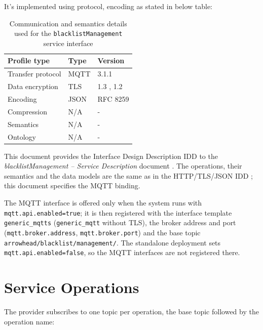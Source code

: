 \documentclass[a4paper]{arrowhead}
\begin{document}
It's implemented using protocol, encoding as stated in below table:
\begin{table}[ht!]
  \centering
  \begin{tabular}{|l|l|l|}
    \hline
    \rowcolor{gray!33} Profile type & Type & Version \\ \hline
    Transfer protocol & MQTT & 3.1.1 \cite{mqtt311} \\ \hline
    Data encryption & TLS & 1.3 \cite{rfc8446}, 1.2 \cite{rfc5246} \\ \hline
    Encoding & JSON & RFC 8259 \cite{rfc8259} \\ \hline
    Compression & N/A & - \\ \hline
    Semantics & N/A & - \\ \hline
    Ontology & N/A & - \\ \hline
  \end{tabular}
  \caption{Communication and semantics details used for the \texttt{blacklist\allowbreak{}Management} service interface}
  \label{tab:comunication_semantics_profile}
\end{table}

This document provides the Interface Design Description IDD to the \textit{blacklistManagement -- Service Description} document \cite{bl-blacklistManagement-sd}.
The operations, their semantics and the data models are the same as in the HTTP/TLS/JSON IDD \cite{bl-blacklistManagement-http-idd}; this document specifies the MQTT binding.

The MQTT interface is offered only when the system runs with \texttt{mqtt.api.enabled=true}; it is then registered with the interface template \texttt{generic\_\allowbreak{}mqtts} (\texttt{generic\_\allowbreak{}mqtt} without TLS), the broker address and port (\texttt{mqtt.\allowbreak{}broker.\allowbreak{}address}, \texttt{mqtt.\allowbreak{}broker.\allowbreak{}port}) and the base topic \texttt{arrowhead/\allowbreak{}blacklist/\allowbreak{}management/\allowbreak{}}. The standalone deployment sets \texttt{mqtt.\allowbreak{}api.\allowbreak{}enabled=\allowbreak{}false}, so the MQTT interfaces are not registered there.

\newpage

\section{Service Operations}
\label{sec:operations}

The provider subscribes to one topic per operation, the base topic followed by the operation name:
\end{document}
